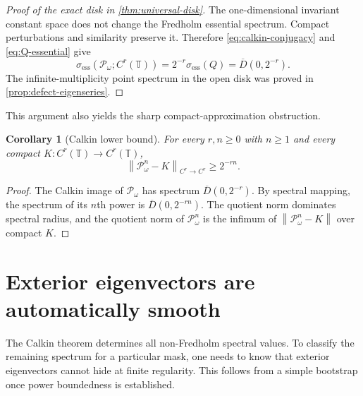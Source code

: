 \documentclass[11pt,a4paper]{article}
\newtheorem{corollary}[theorem]{Corollary}
\theoremstyle{definition}
\theoremstyle{remark}
\newcommand{\T}{\mathbb T}
\newcommand{\Dbar}[1]{\overline{D}(0,#1)}
\newcommand{\spece}{\sigma_{\mathrm{ess}}}
\newcommand{\norm}[1]{\left\lVert #1\right\rVert}
\newcommand{\Pop}{\mathcal P}
\begin{document}
\begin{proof}[Proof of the exact disk in \cref{thm:universal-disk}]
The one-dimensional invariant constant space does not change the Fredholm
essential spectrum.  Compact perturbations and similarity preserve it.
Therefore \eqref{eq:calkin-conjugacy} and \eqref{eq:Q-essential} give
\[
 \spece(\Pop_\omega;C^r(\T))
 =2^{-r}\spece(Q)=\Dbar{2^{-r}}.
\]
The infinite-multiplicity point spectrum in the open disk was proved in
\cref{prop:defect-eigenseries}.
\end{proof}

This argument also yields the sharp compact-approximation obstruction.

\begin{corollary}[Calkin lower bound]
\label{cor:Calkin-lower}
For every $r,n\ge0$ with $n\ge1$ and every compact
$K:C^r(\T)\to C^r(\T)$,
\begin{equation}
 \norm{\Pop_\omega^n-K}_{C^r\to C^r}\ge 2^{-rn}.
 \label{eq:P-compact-lower}
\end{equation}
\end{corollary}
\begin{proof}
The Calkin image of $\Pop_\omega$ has spectrum $\Dbar{2^{-r}}$.
By spectral mapping, the spectrum of its $n$th power is
$\Dbar{2^{-rn}}$.  The quotient norm dominates spectral radius, and the
quotient norm of $\Pop_\omega^n$ is the infimum of
$\norm{\Pop_\omega^n-K}$ over compact $K$.
\end{proof}

\section{Exterior eigenvectors are automatically smooth}
\label{sec:bootstrap}

The Calkin theorem determines all non-Fredholm spectral values.  To classify
the remaining spectrum for a particular mask, one needs to know that exterior
eigenvectors cannot hide at finite regularity.  This follows from a simple
bootstrap once power boundedness is established.
\end{document}
